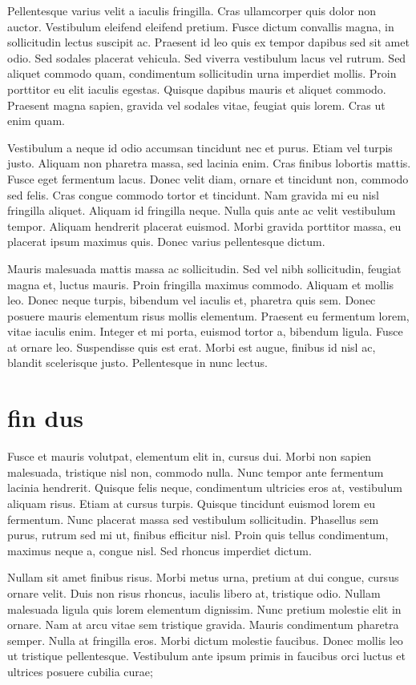 Pellentesque varius velit a iaculis fringilla. 
Cras ullamcorper quis dolor non auctor. 
Vestibulum eleifend eleifend pretium. 
Fusce dictum convallis magna, in sollicitudin lectus suscipit ac. 
Praesent id leo quis ex tempor dapibus sed sit amet odio. 
Sed sodales placerat vehicula. 
Sed viverra vestibulum lacus vel rutrum. 
Sed aliquet commodo quam, condimentum sollicitudin urna imperdiet mollis. 
Proin porttitor eu elit iaculis egestas. 
Quisque dapibus mauris et aliquet commodo. 
Praesent magna sapien, gravida vel sodales vitae, feugiat quis lorem. 
Cras ut enim quam.

Vestibulum a neque id odio accumsan tincidunt nec et purus. 
Etiam vel turpis justo. 
Aliquam non pharetra massa, sed lacinia enim. 
Cras finibus lobortis mattis. 
Fusce eget fermentum lacus. 
Donec velit diam, ornare et tincidunt non, commodo sed felis. 
Cras congue commodo tortor et tincidunt. 
Nam gravida mi eu nisl fringilla aliquet. 
Aliquam id fringilla neque. 
Nulla quis ante ac velit vestibulum tempor. 
Aliquam hendrerit placerat euismod. 
Morbi gravida porttitor massa, eu placerat ipsum maximus quis. 
Donec varius pellentesque dictum.

Mauris malesuada mattis massa ac sollicitudin. 
Sed vel nibh sollicitudin, feugiat magna et, luctus mauris. 
Proin fringilla maximus commodo. 
Aliquam et mollis leo. 
Donec neque turpis, bibendum vel iaculis et, pharetra quis sem. 
Donec posuere mauris elementum risus mollis elementum. 
Praesent eu fermentum lorem, vitae iaculis enim. 
Integer et mi porta, euismod tortor a, bibendum ligula. 
Fusce at ornare leo. 
Suspendisse quis est erat. 
Morbi est augue, finibus id nisl ac, blandit scelerisque justo. 
Pellentesque in nunc lectus.

\section{fin dus}
Fusce et mauris volutpat, elementum elit in, cursus dui. 
Morbi non sapien malesuada, tristique nisl non, commodo nulla. 
Nunc tempor ante fermentum lacinia hendrerit. 
Quisque felis neque, condimentum ultricies eros at, vestibulum aliquam risus. 
Etiam at cursus turpis. 
Quisque tincidunt euismod lorem eu fermentum. 
Nunc placerat massa sed vestibulum sollicitudin. 
Phasellus sem purus, rutrum sed mi ut, finibus efficitur nisl. 
Proin quis tellus condimentum, maximus neque a, congue nisl. 
Sed rhoncus imperdiet dictum.

Nullam sit amet finibus risus. 
Morbi metus urna, pretium at dui congue, cursus ornare velit. 
Duis non risus rhoncus, iaculis libero at, tristique odio. 
Nullam malesuada ligula quis lorem elementum dignissim. 
Nunc pretium molestie elit in ornare. 
Nam at arcu vitae sem tristique gravida. 
Mauris condimentum pharetra semper. 
Nulla at fringilla eros. 
Morbi dictum molestie faucibus. 
Donec mollis leo ut tristique pellentesque. 
Vestibulum ante ipsum primis in faucibus orci luctus et ultrices posuere cubilia curae;

